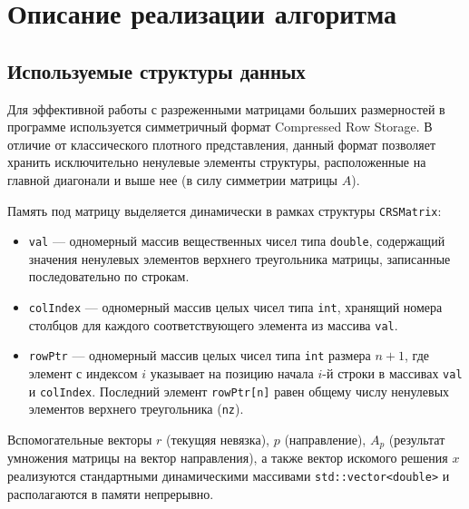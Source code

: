 \documentclass[12pt, a4paper]{article}
\begin{document}
\section{Описание реализации алгоритма}

\subsection{Используемые структуры данных}
Для эффективной работы с разреженными матрицами больших размерностей в программе используется симметричный формат Compressed Row Storage. В отличие от классического плотного представления, данный формат позволяет хранить исключительно ненулевые элементы структуры, расположенные на главной диагонали и выше нее (в силу симметрии матрицы $A$). 

Память под матрицу выделяется динамически в рамках структуры \texttt{CRSMatrix}:
\begin{itemize}
    \item \texttt{val} — одномерный массив вещественных чисел типа \texttt{double}, содержащий значения ненулевых элементов верхнего треугольника матрицы, записанные последовательно по строкам.
    \item \texttt{colIndex} — одномерный массив целых чисел типа \texttt{int}, хранящий номера столбцов для каждого соответствующего элемента из массива \texttt{val}.
    \item \texttt{rowPtr} — одномерный массив целых чисел типа \texttt{int} размера $n+1$, где элемент с индексом $i$ указывает на позицию начала $i$-й строки в массивах \texttt{val} и \texttt{colIndex}. Последний элемент \texttt{rowPtr[n]} равен общему числу ненулевых элементов верхнего треугольника (\texttt{nz}).
\end{itemize}

Вспомогательные векторы $r$ (текущяя невязка), $p$ (направление), $A_p$ (результат умножения матрицы на вектор направления), 
а также вектор искомого решения $x$ реализуются стандартными динамическими массивами \texttt{std::vector<double>} и располагаются в памяти непрерывно.
\end{document}
